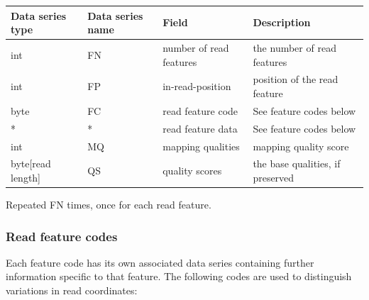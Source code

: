 \documentclass[a4paper]{article}
\begin{document}
\begin{threeparttable}[t]
\begin{tabular}{|>{\raggedright}p{88pt}|>{\raggedright}p{83pt}|>{\raggedright}p{85pt}|>{\raggedright}p{180pt}|}
\hline
\textbf{Data series type} & \textbf{Data series name} & \textbf{Field} & \textbf{Description}\tabularnewline
\hline
int & FN & number of read features & the number of read features\tabularnewline
\hline
int & FP & in-read-position\tnote{a} & position of the read feature\tabularnewline 
\hline
byte & FC & read feature code\tnote{a} & See feature codes below\tabularnewline
\hline
* & * & read feature data\tnote{a} & See feature codes below\tabularnewline
\hline
int & MQ & mapping qualities & mapping quality score\tabularnewline
\hline
byte[read length] & QS & quality scores & the base qualities, if preserved\tabularnewline
\hline
\end{tabular}
\begin{tablenotes}
\item[a] Repeated FN times, once for each read feature.
\end{tablenotes}
\end{threeparttable}

\subsubsection*{Read feature codes}

Each feature code has its own associated data series containing further information specific to that feature.
The following codes are used to distinguish variations in read coordinates:
\end{document}
